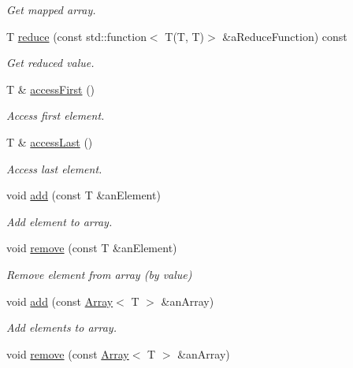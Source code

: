 \begin{DoxyCompactItemize}
\begin{DoxyCompactList}\small\item\em Get mapped array. \end{DoxyCompactList}\item 
T \hyperlink{classostk_1_1core_1_1ctnr_1_1_array_a26fb804388b4f3fad508fa1cd7867f52}{reduce} (const std\+::function$<$ T(T, T)$>$ \&a\+Reduce\+Function) const
\begin{DoxyCompactList}\small\item\em Get reduced value. \end{DoxyCompactList}\item 
T \& \hyperlink{classostk_1_1core_1_1ctnr_1_1_array_a88b92f1b1cd74fe742449a0aaa51f2fb}{access\+First} ()
\begin{DoxyCompactList}\small\item\em Access first element. \end{DoxyCompactList}\item 
T \& \hyperlink{classostk_1_1core_1_1ctnr_1_1_array_a50d0a7c9f1c121f8c6b9638663acdff3}{access\+Last} ()
\begin{DoxyCompactList}\small\item\em Access last element. \end{DoxyCompactList}\item 
void \hyperlink{classostk_1_1core_1_1ctnr_1_1_array_a3da40b4167e78eb748fa39a12cdeb21e}{add} (const T \&an\+Element)
\begin{DoxyCompactList}\small\item\em Add element to array. \end{DoxyCompactList}\item 
void \hyperlink{classostk_1_1core_1_1ctnr_1_1_array_a181587d350f45e2438583234a73b03f5}{remove} (const T \&an\+Element)
\begin{DoxyCompactList}\small\item\em Remove element from array (by value) \end{DoxyCompactList}\item 
void \hyperlink{classostk_1_1core_1_1ctnr_1_1_array_a53cc258c0052dee12217670f2bca3540}{add} (const \hyperlink{classostk_1_1core_1_1ctnr_1_1_array}{Array}$<$ T $>$ \&an\+Array)
\begin{DoxyCompactList}\small\item\em Add elements to array. \end{DoxyCompactList}\item 
void \hyperlink{classostk_1_1core_1_1ctnr_1_1_array_a9409ea2330b85382d25bc4df7c6b993f}{remove} (const \hyperlink{classostk_1_1core_1_1ctnr_1_1_array}{Array}$<$ T $>$ \&an\+Array)

\end{DoxyCompactItemize}
